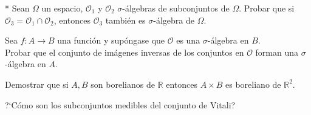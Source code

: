 \documentclass{book}
\newcommand{\rr}{\mathbb{R}}
\begin{document}
\begin{ejer}{}* 
Sean $\Omega$ un espacio, $\mathscr{O}_1$ y  $\mathscr{O}_2$ $\sigma$-\'algebras de subconjuntos de 
$\Omega$. Probar que si $\mathscr{O}_3=\mathscr{O}_1\cap \mathscr{O}_2$, entonces $\mathscr{O}_3$ 
tambi\'en es $\sigma$-\'algebra de $\Omega$. 
\end{ejer} 


\begin{ejer}{} 
Sea $f: A\to B$ una funci\'on  y sup\'ongase que $\mathscr{O}$ es una $\sigma$-\'algebra en $B$. \\
Probar que el conjunto de im\'agenes inversas de los conjuntos en $\mathscr{O}$  forman una 
$\sigma$-\'algebra en $A$. 
\end{ejer}


  

	\begin{ejer}{} Demostrar que si $A,B$ son borelianos de $\rr$ entonces $A\times B$ es boreliano de $\rr^2$. 
	 
	\end{ejer}




  
   \begin{ejer}{} 
	?`Cómo son los subconjuntos medibles del conjunto de Vitali?
\end{ejer} 
\end{document}
